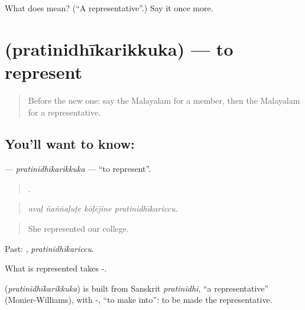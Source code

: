 \begin{tcolorbox}[breakable,colback=teal!4,colframe=teal!35!black,title={Before you move on}]
What does  mean? (\textquotedblleft{}A representative\textquotedblright{}.) Say it once more.
\end{tcolorbox}
\section[\texorpdfstring{\ml{പ്രതിനിധീകരിക്കുക} (pratinidhīkarikkuka)}{പ്രതിനിധീകരിക്കുക (pratinidhīkarikkuka)}]{ (pratinidhīkarikkuka) — to represent}

\label{lesson:ML-C422-pratinidhikarikkuka}



\begin{quote}
Before the new one: say the Malayalam for a member, then the Malayalam for a representative.
\end{quote}

\subsection*{You'll want to know: }
\textbf{} — \emph{pratinidhīkarikkuka} — \textquotedblleft{}to represent\textquotedblright{}.

\begin{quote}
   .
\end{quote}

\begin{quote}
\emph{avaḷ ñaṅṅaḷuṭe kōḷējine pratinidhīkariccu.}
\end{quote}

\begin{quote}
She represented our college.
\end{quote}

Past: , \emph{pratinidhīkariccu}.

What is represented takes -.

\begin{cousinweb}
\textbf{} (\emph{pratinidhīkarikkuka}) is built from Sanskrit \emph{pratinidhi}, \textquotedblleft{}a representative\textquotedblright{} (Monier-Williams), with -, \textquotedblleft{}to make into\textquotedblright{}: to be made the representative.
\end{cousinweb}

